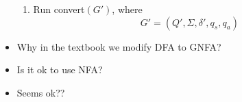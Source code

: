 \begin{frame}[allowframebreaks]
\begin{itemize}
\begin{enumerate}
\item Run convert$(G')$, where
  \begin{equation*}
    G' =
(Q', \Sigma, \delta', q_s, q_a)
  \end{equation*}
  \end{enumerate}

\item Why in the textbook we modify DFA to GNFA?
\item [] Is it ok to use NFA?

\item [] Seems ok?? 
\end{itemize}\end{frame}













